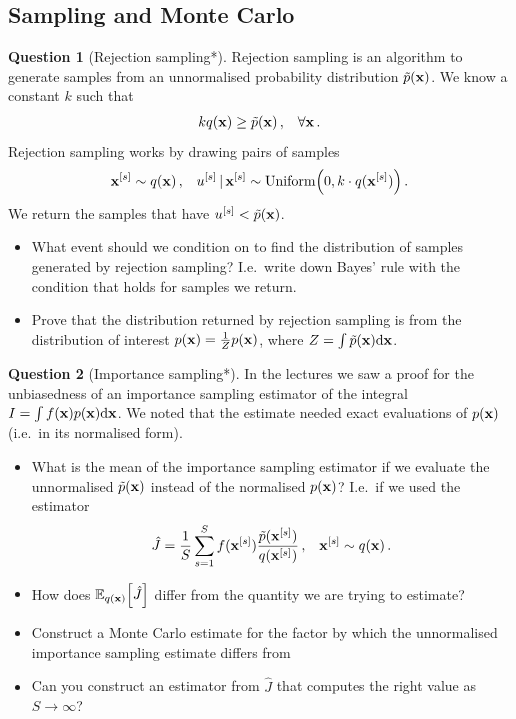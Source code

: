 \documentclass[a4paper]{article}
\theoremstyle{definition}
\newtheorem{question}{Question}
\begin{document}
\subsection{Sampling and Monte Carlo}
\begin{question}[Rejection sampling*]
\label{q:rejection-sampling-proof}
Rejection sampling is an algorithm to generate samples from an unnormalised probability distribution $\tilde p(\mathbf{x})$. We know a constant $k$ such that
\begin{align}
kq(\mathbf{x}) \geq \tilde{p}(\mathbf{x}) \,, && \forall \mathbf{x} \,.
\end{align}
Rejection sampling works by drawing pairs of samples
\begin{align}
\vx^{[s]} \sim q(\vx) \,, && u^{[s]} \given \vx^{[s]} \sim \mathrm{Uniform}\left(0, k\cdot q(\vx^{[s]})\right) \,.
\end{align}
We return the samples that have $u^{[s]} < \tilde p(\mathbf{x})$.
\begin{itemize}
\item What event should we condition on to find the distribution of samples generated by rejection sampling? I.e.~write down Bayes' rule with the condition that holds for samples we return.
\item Prove that the distribution returned by rejection sampling is from the distribution of interest $p(\mathbf{x}) = \frac{1}{Z} p(\mathbf{x})$, where $Z = \int \tilde p(\mathbf{x})\mathrm{d}{\mathbf{x}}$.
\end{itemize}
\end{question}

\begin{question}[Importance sampling*]
\label{q:importance-sampling-unnormalised}
In the lectures we saw a proof for the unbiasedness of an importance sampling estimator of the integral $I = \int f(\mathbf{x}) p(\mathbf{x}) \mathrm{d}{\mathbf{x}}$. We noted that the estimate needed exact evaluations of $p(\mathbf{x})$ (i.e.~in its normalised form).
\begin{itemize}
\item What is the mean of the importance sampling estimator if we evaluate the unnormalised $\tilde p(\mathbf{x})$ instead of the normalised $p(\mathbf{x})$? I.e.~if we used the estimator
\begin{align}
\hat{J} = \frac{1}{S}\sum_{s=1}^S f(\mathbf{x}^{[s]}) \frac{\tilde p(\mathbf{x}^{[s]})}{q(\mathbf{x}^{[s]})} \,, && \mathbf{x}^{[s]} \sim q(\mathbf{x}) \,.
\end{align}
\item How does $\Exp{q(\vx)}{\hat J}$ differ from the quantity we are trying to estimate?
\item Construct a Monte Carlo estimate for the factor by which the unnormalised importance sampling estimate differs from 
\item Can you construct an estimator from $\hat J$ that computes the right value as $S \to \infty$?
\end{itemize}
\end{question}
\end{document}
